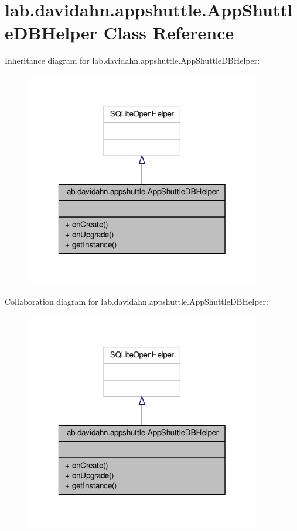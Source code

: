 \hypertarget{classlab_1_1davidahn_1_1appshuttle_1_1_app_shuttle_d_b_helper}{\section{lab.\-davidahn.\-appshuttle.\-App\-Shuttle\-D\-B\-Helper \-Class \-Reference}
\label{classlab_1_1davidahn_1_1appshuttle_1_1_app_shuttle_d_b_helper}
}


\-Inheritance diagram for lab.\-davidahn.\-appshuttle.\-App\-Shuttle\-D\-B\-Helper\-:
\nopagebreak
\begin{figure}[H]
\begin{center}
\leavevmode
\includegraphics[width=292pt]{classlab_1_1davidahn_1_1appshuttle_1_1_app_shuttle_d_b_helper__inherit__graph}
\end{center}
\end{figure}


\-Collaboration diagram for lab.\-davidahn.\-appshuttle.\-App\-Shuttle\-D\-B\-Helper\-:
\nopagebreak
\begin{figure}[H]
\begin{center}
\leavevmode
\includegraphics[width=292pt]{classlab_1_1davidahn_1_1appshuttle_1_1_app_shuttle_d_b_helper__coll__graph}
\end{center}
\end{figure}
